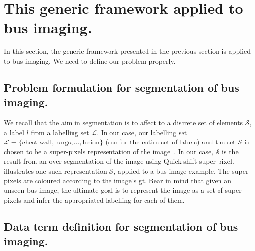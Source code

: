 \section{This generic framework applied to \ac{bus} imaging.}

In this section, the generic framework presented in the previous section is applied to \ac{bus} imaging. We need to define our problem properly. 

\subsection{Problem formulation for segmentation of \ac{bus} imaging.}

We recall that the aim in segmentation is to affect to a discrete set of elements $\mathcal{S}$, a label $l$ from a labelling set $\mathcal{L}$. In our case, our labelling set $\mathcal{L} = \{ \text{chest wall}, \text{lungs}, \dots, \text{lesion} \}$ (see  for the entire set of labels) and the set $\mathcal{S}$ is chosen to be a super-pixels representation of the image~\cite{achanta2012slic}. In our case, $\mathcal{S}$ is the result from an over-segmentation of the image using Quick-shift super-pixel.  illustrates one such representation $\mathcal{S}$, applied to a \ac{bus} image example. The super-pixels are coloured according to the image's \ac{gt}. Bear in mind that given an unseen \ac{bus} image, the ultimate goal is to represent the image as a set of super-pixels and infer the appropriated labelling for each of them.

\subsection{Data term definition for segmentation of \ac{bus} imaging.} \label{sec:method:dterm:feat}

